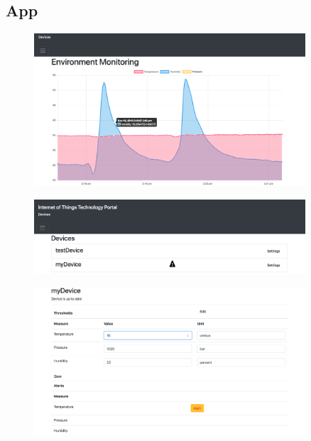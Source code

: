 \subsection{App}

\begin{figure}[H]
    \centering
    \includegraphics[width=0.9\textwidth]{figures/App/app_dashboard}
    \caption{}
    \label{}
\end{figure}

\begin{figure}[H]
    \centering
    \includegraphics[width=0.9\textwidth]{figures/App/app_device_list}
    \caption{}
    \label{}
\end{figure}

\begin{figure}[H]
    \centering
    \includegraphics[width=0.9\textwidth]{figures/App/app_device_settings}
    \caption{}
    \label{}
\end{figure}
